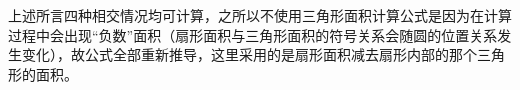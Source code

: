 上述所言四种相交情况均可计算，之所以不使用三角形面积计算公式是因为在计算过程中会出现“负数”面积（扇形面积与三角形面积的符号关系会随圆的位置关系发生变化），故公式全部重新推导，这里采用的是扇形面积减去扇形内部的那个三角形的面积。